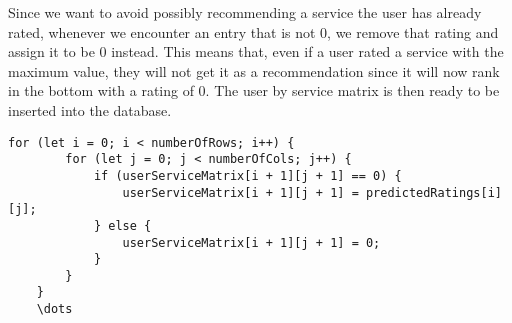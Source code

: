 Since we want to avoid possibly recommending a service the user has already rated, whenever we encounter an entry that is not 0, we remove that rating and assign it to be 0 instead.
This means that, even if a user rated a service with the maximum value, they will not get it as a recommendation since it will now rank in the bottom with a rating of 0.
The user by service matrix is then ready to be inserted into the database.
\begin{lstlisting}[caption={}, captionpos=b, label={}]
    for (let i = 0; i < numberOfRows; i++) {
        for (let j = 0; j < numberOfCols; j++) {
            if (userServiceMatrix[i + 1][j + 1] == 0) {
                userServiceMatrix[i + 1][j + 1] = predictedRatings[i][j];
            } else {
                userServiceMatrix[i + 1][j + 1] = 0;
            }
        }
    }
    \dots
\end{lstlisting}